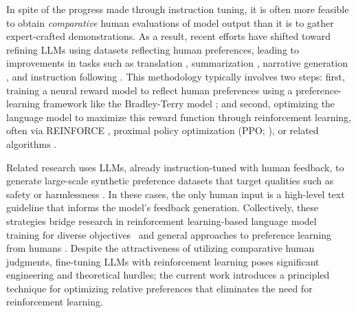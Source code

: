 In spite of the progress made through instruction tuning, it is often more feasible to obtain \textit{comparative} human evaluations of model output than it is to gather expert-crafted demonstrations. As a result, recent efforts have shifted toward refining LLMs using datasets reflecting human preferences, leading to improvements in tasks such as translation \citep{kreutzer-etal-2018-reliability}, summarization \citep{stiennon2022learning,ziegler2020finetuning}, narrative generation \citep{ziegler2020finetuning}, and instruction following \citep{ouyang2022training,ramamurthy2023is}. This methodology typically involves two steps: first, training a neural reward model to reflect human preferences using a preference-learning framework like the Bradley-Terry model \citep{bradley1952rankanalysis}; and second, optimizing the language model to maximize this reward function through reinforcement learning, often via REINFORCE \citep{williams1992reinforce}, proximal policy optimization (PPO; \cite{schulman2017proximal}), or related algorithms \citep{ramamurthy2023is}. 

Related research uses LLMs, already instruction-tuned with human feedback, to generate large-scale synthetic preference datasets that target qualities such as safety or harmlessness \citep{bai2022constitutional}. In these cases, the only human input is a high-level text guideline that informs the model's feedback generation. Collectively, these strategies bridge research in reinforcement learning-based language model training for diverse objectives~\citep{Ranzato2015SequenceLT,paulus2018a,wu2018learning} and general approaches to preference learning from humans \citep{christiano2017deep,kupcsik2018learning}. Despite the attractiveness of utilizing comparative human judgments, fine-tuning LLMs with reinforcement learning poses significant engineering and theoretical hurdles; the current work introduces a principled technique for optimizing relative preferences that eliminates the need for reinforcement learning.

